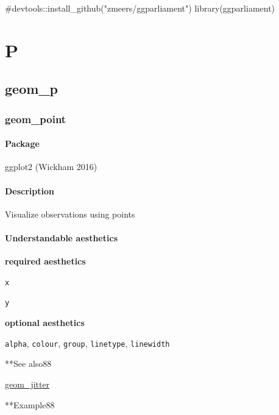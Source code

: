 \documentclass[
  letterpaper,
  DIV=11,
  numbers=noendperiod]{scrreprt}
\newenvironment{Shaded}{\begin{snugshade}}{\end{snugshade}}
\newcommand{\CommentTok}[1]{\textcolor[rgb]{0.37,0.37,0.37}{#1}}
\newcommand{\FunctionTok}[1]{\textcolor[rgb]{0.28,0.35,0.67}{#1}}
\newcommand{\NormalTok}[1]{\textcolor[rgb]{0.00,0.23,0.31}{#1}}
\begin{document}
\begin{Shaded}
\begin{Highlighting}[]
\CommentTok{\#devtools::install\_github("zmeers/ggparliament")}
\FunctionTok{library}\NormalTok{(ggparliament)}
\end{Highlighting}
\end{Shaded}

\part{P}

\chapter{geom\_p}\label{sec-p}

\section{geom\_point}\label{geom_point}

\subsection{Package}\label{package-6}

ggplot2 (Wickham 2016)

\subsection{Description}\label{description-6}

Visualize observations using points

\subsection{Understandable
aesthetics}\label{understandable-aesthetics-8}

\textbf{required aesthetics}

\texttt{x}

\texttt{y}

\textbf{optional aesthetics}

\texttt{alpha}, \texttt{colour}, \texttt{group}, \texttt{linetype},
\texttt{linewidth}

**See also88

\hyperref[jitter]{geom\_jitter}

**Example88
\end{document}
